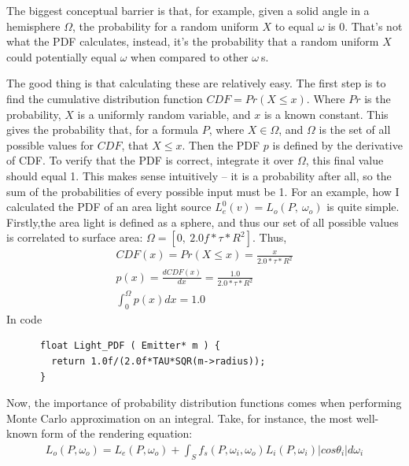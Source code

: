 \documentclass{article}
\begin{document}
    The biggest conceptual barrier is that, for example, given a solid angle in
a hemisphere $\Omega$, the probability for a random uniform $X$ to equal
$\omega$ is 0. That's not what the PDF calculates, instead, it's the probability
that a random uniform $X$ could potentially equal $\omega$ when compared to
other $\omega\:$s.
    

    The good thing is that calculating these are relatively easy. The first step
is to find the cumulative distribution function $CDF = Pr(X \leq x)$. Where $Pr$
is the probability, $X$ is a uniformly random variable, and $x$ is a known
constant. This gives the probability that, for a formula $P$, where $X \in
\Omega$, and $\Omega$ is the set of all possible values for $CDF$, that $X \leq
x$. Then the PDF $p$ is defined by the derivative of CDF. To verify that the PDF
is correct, integrate it over $\Omega$, this final value should equal 1. This
makes sense intuitively -- it is a probability after all, so the sum of the
probabilities of every possible input must be 1. For an example, how I
calculated the PDF of an area light source
      $L^0_e(v) = L_o(P,\:\omega_o)$ 
    is quite simple. Firstly,the area light is defined as a sphere, and thus our
set of all possible values is correlated to surface area:
    $\Omega = [0,\:2.0f*\tau*R^2]$. Thus,
    \begin{align}
      CDF(x) = Pr(X \leq x) = \frac{x}{2.0*\tau*R^2}\\
      p(x) = \frac{dCDF(x)}{dx} = \frac{1.0}{2.0*\tau*R^2}\\
      \int_0^{\Omega}p(x)dx = 1.0
    \end{align}
    In code
    \begin{lstlisting}
      float Light_PDF ( Emitter* m ) {
        return 1.0f/(2.0f*TAU*SQR(m->radius));
      }
    \end{lstlisting}
    
    
  
  Now, the importance of probability distribution functions comes when
performing Monte Carlo approximation on an integral. Take, for instance, the
most well-known form of the rendering equation:
  \begin{align}
    L_o(P, \omega_o) = L_e(P, \omega_o) + \int_{S}f_s(P, \omega_i,
    \omega_o) L_i(P, \omega_i) \vert cos\theta_i\vert d\omega_i
  \end{align}
  
\end{document}
